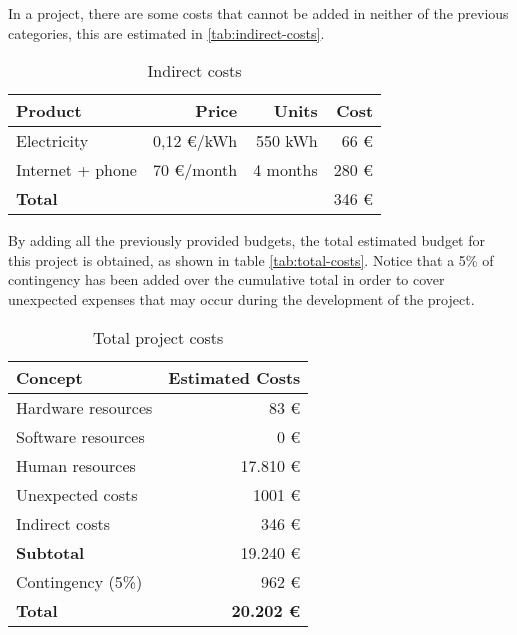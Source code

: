 
In a project, there are some costs that cannot be added in neither of the previous categories,
this are estimated in \autoref{tab:indirect-costs}.

\begin{table}[H]
  \centering
  \begin{tabular}{|l|r|r|r|}
    \hline
    \textbf{Product} & \textbf{Price} & \textbf{Units} & \textbf{Cost} \\ \hline\hline

    Electricity & 0,12 €/kWh & 550 kWh & 66 € \\ \hline
    Internet + phone & 70 €/month & 4 months & 280 € \\ \hline
    
    \hline\hline
    \textbf{Total} & & & 346 € \\ \hline
  \end{tabular}
  \caption{Indirect costs \label{tab:indirect-costs}}
\end{table}


By adding all the previously provided budgets, the total estimated budget for this project
is obtained, as shown in table \autoref{tab:total-costs}. Notice that a 5\% of contingency
has been added over the cumulative total in order to cover unexpected expenses that may 
occur during the development of the project.

\begin{table}[H]
  \centering
  \begin{tabular}{|l|r|}
    \hline
    \textbf{Concept} & \textbf{Estimated Costs} \\ \hline\hline

    Hardware resources & 83 € \\ \hline
    Software resources & 0 € \\ \hline
    Human resources & 17.810 € \\ \hline
    Unexpected costs & 1001 € \\ \hline
    Indirect costs & 346 € \\ \hline

    \hline\hline
    \textbf{Subtotal} & 19.240 € \\
    \hline\hline
    Contingency (5\%) & 962 € \\
    \hline\hline
    \textbf{Total} & \textbf{20.202 €} \\ \hline
  \end{tabular}

  \caption{Total project costs \label{tab:total-costs}}
\end{table}

